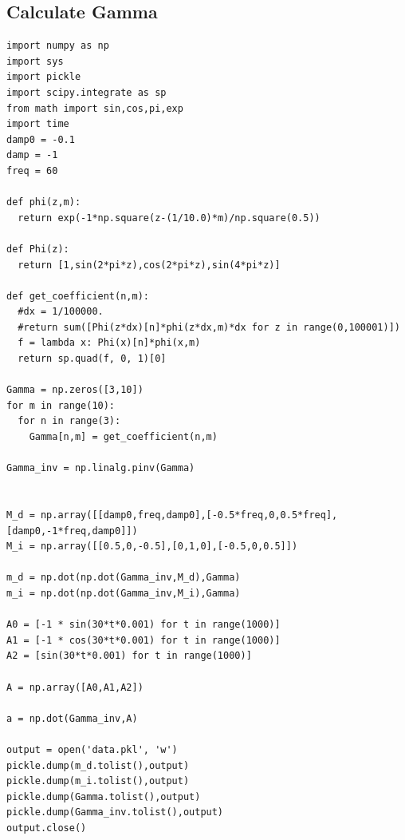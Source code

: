 \documentclass[12pt]{article}
\begin{document}
\subsection*{Calculate Gamma}
\begin{verbatim}
import numpy as np
import sys
import pickle
import scipy.integrate as sp
from math import sin,cos,pi,exp
import time
damp0 = -0.1
damp = -1
freq = 60

def phi(z,m):
  return exp(-1*np.square(z-(1/10.0)*m)/np.square(0.5))

def Phi(z):
  return [1,sin(2*pi*z),cos(2*pi*z),sin(4*pi*z)]

def get_coefficient(n,m):
  #dx = 1/100000.
  #return sum([Phi(z*dx)[n]*phi(z*dx,m)*dx for z in range(0,100001)])
  f = lambda x: Phi(x)[n]*phi(x,m)
  return sp.quad(f, 0, 1)[0]

Gamma = np.zeros([3,10])
for m in range(10):
  for n in range(3):
    Gamma[n,m] = get_coefficient(n,m)

Gamma_inv = np.linalg.pinv(Gamma)


M_d = np.array([[damp0,freq,damp0],[-0.5*freq,0,0.5*freq],[damp0,-1*freq,damp0]])
M_i = np.array([[0.5,0,-0.5],[0,1,0],[-0.5,0,0.5]])

m_d = np.dot(np.dot(Gamma_inv,M_d),Gamma)
m_i = np.dot(np.dot(Gamma_inv,M_i),Gamma)

A0 = [-1 * sin(30*t*0.001) for t in range(1000)]
A1 = [-1 * cos(30*t*0.001) for t in range(1000)]
A2 = [sin(30*t*0.001) for t in range(1000)]

A = np.array([A0,A1,A2])

a = np.dot(Gamma_inv,A)

output = open('data.pkl', 'w')
pickle.dump(m_d.tolist(),output)
pickle.dump(m_i.tolist(),output)
pickle.dump(Gamma.tolist(),output)
pickle.dump(Gamma_inv.tolist(),output)
output.close()
\end{verbatim}
\end{document}
